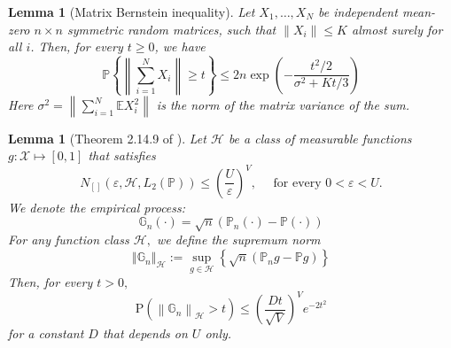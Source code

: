 \documentclass{article}
\numberwithin{equation}{section}
\theoremstyle{plain}
\newtheorem{lemma}[theorem]{Lemma}
\theoremstyle{definition}
\theoremstyle{remark}
\begin{document}
\begin{lemma}[Matrix Bernstein inequality]\label{ine_matrix_bernstein}
 Let $X_{1}, \ldots, X_{N}$ be independent mean-zero $n \times n$ symmetric random matrices, such that $\left\|X_{i}\right\| \leq K$ almost surely for all $i$. Then, for every $t \geq 0$, we have
$$
\mathbb{P}\left\{\left\|\sum_{i=1}^{N} X_{i}\right\| \geq t\right\} \leq 2 n \exp \left(-\frac{t^{2} / 2}{\sigma^{2}+K t / 3}\right)
$$
Here $\sigma^{2}=\left\|\sum_{i=1}^{N} \mathbb{E} X_{i}^{2}\right\|$ is the norm of the matrix variance of the sum.
\end{lemma}

\begin{lemma}[Theorem 2.14.9 of \citep{empirical_process}]\label{maxima_of_empirical_process}
   Let $\mathcal{H}$ be a class of measurable functions $g: \mathcal{X} \mapsto[0,1]$ that satisfies 
   $$
   N_{[]}\left(\varepsilon, \mathcal{H}, L_{2}(\mathbb{P})\right) \leq\left(\frac{U}{\varepsilon}\right)^{V}, \quad \text { for every } 0<\varepsilon<U.
   $$
   We denote the empirical process: $$\mathbb{G}_n(\cdot)=\sqrt{n} (\mathbb{P}_n (\cdot) - \mathbb{P} (\cdot) ) $$
   For any function class $\mathcal{H},$ we define the supremum norm
   $$
   \left\Vert \mathbb{G}_n \right\Vert_{\mathcal{H}} := \sup_{g \in \mathcal{H}} \left\{\sqrt{n} (\mathbb{P}_n g - \mathbb{P} g)\right\}
   $$
   Then, for every $t>0,$
    $$
    \mathrm{P}\left(\left\|\mathbb{G}_{n}\right\|_{\mathcal{H}}>t\right) \leq\left(\frac{D t}{\sqrt{V}}\right)^{V} e^{-2 t^{2}}
    $$
    for a constant $D$ that depends on $U$ only.
\end{lemma}
\end{document}
